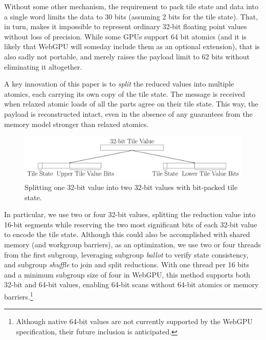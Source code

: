 \documentclass[acmsmall, manuscript, screen, review, anonymous]{acmart}
\begin{document}
Without some other mechanism, the requirement to pack tile state and data into a single word limits the data to 30 bits (assuming 2 bits for the tile state). That, in turn, makes it impossible to represent ordinary 32-bit floating point values without loss of precision. While some GPUs support 64 bit atomics (and it is likely that WebGPU will someday include them as an optional extension), that is also sadly not portable, and merely raises the payload limit to 62 bits without eliminating it altogether.

A key innovation of this paper is to \emph{split} the reduced values into multiple atomics, each carrying its own copy of the tile state. The message is received when relaxed atomic loads of all the parts agree on their tile state. This way, the payload is reconstructed intact, even in the absence of any guarantees from the memory model stronger than relaxed atomics.

\begin{figure}[h!]
  \centering
  \includegraphics[width=\linewidth]{graphics/split.pdf}
  \caption{Splitting one 32-bit value into two 32-bit values with bit-packed tile state.}
\end{figure}

In particular, we use two or four 32-bit values, splitting the reduction value into 16-bit segments while reserving the two most significant bits of each 32-bit value to encode the tile state. Although this could also be accomplished with shared memory (and workgroup barriers), as an optimization, we use two or four threads from the first subgroup, leveraging subgroup \emph{ballot} to verify state consistency, and subgroup \emph{shuffle} to join and split reductions. With one thread per 16 bits and a minimum subgroup size of four in WebGPU, this method supports both 32-bit and 64-bit values, enabling 64-bit scans without 64-bit atomics or memory barriers.\footnote{Although native 64-bit values are not currently supported by the WebGPU specification, their future inclusion is anticipated.}
\end{document}
